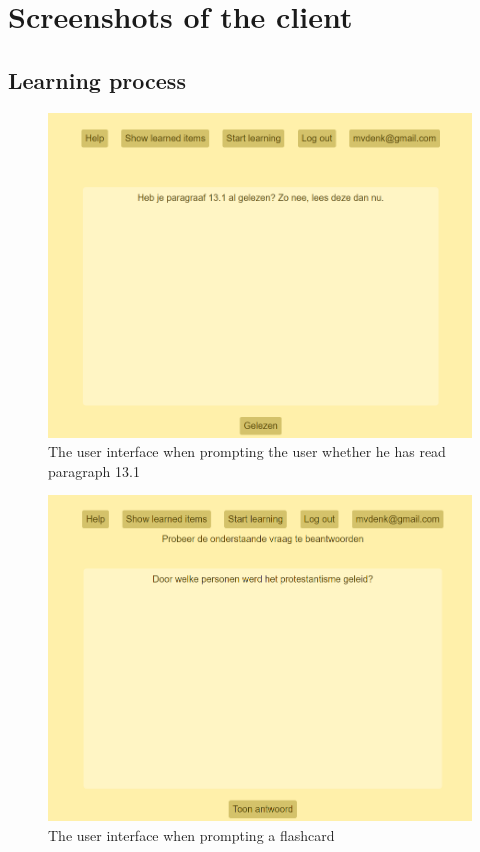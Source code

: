 \chapter{Screenshots of the client}
\label{app:screenshots}

\section{Learning process}

\begin{figure}
    \centering
    \includegraphics[width=.8\textwidth]{img/ui_read_request.png}
    \caption{The user interface when prompting the user whether he has read paragraph 13.1}
    \label{fig:ui_read_request}
\end{figure}

\begin{figure}
    \centering
    \includegraphics[width=.8\textwidth]{img/ui_fc_prompt.png}
    \caption{The user interface when prompting a flashcard}
    \label{fig:ui_fc_prompt}
\end{figure}

